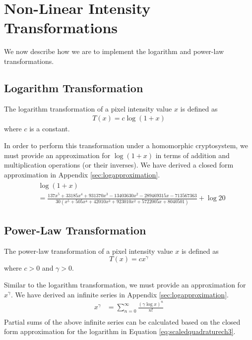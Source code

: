 \section{Non-Linear Intensity Transformations}
We now describe how we are to implement the logarithm and power-law transformations.
\subsection{Logarithm Transformation}
The logarithm transformation of a pixel intensity value $x$ is defined as
\begin{align}
	T\left(x\right) = c \log\left(1 + x\right)
\end{align}
where $c$ is a constant.

In order to perform this transformation under a homomorphic cryptosystem, we must provide an approximation for $\log\left(1 + x\right)$ in terms of addition and multiplication operations (or their inverses). We have derived a closed form approximation in Appendix \ref{sec:logapproximation}.
\begin{align}
	\label{eq:scaledquadraturech3}
  \begin{split}
    &\log(1+x) \\
    &=\frac{137x^5 + 33185x^4 + 931370x^3 - 13403630x^2 - 289469315x - 713567363}
    {30(x^5 + 505x^4 + 42010x^3 + 923010x^2 + 5722005x + 8040501)} + \log{20}
  \end{split}
\end{align}

\subsection{Power-Law Transformation}
The power-law transformation of a pixel intensity value $x$ is defined as
\begin{equation}
    T\left(x\right) = cx^{\gamma}
\end{equation}
where $c>0$ and $\gamma > 0$.

Similar to the logarithm transformation, we must provide an approximation for $x^\gamma$.
We have derived an infinite series in Appendix \ref{sec:logapproximation}.
\begin{align*}
	x^\gamma &= \sum_{n=0}^{\infty}{\frac{(\gamma\log{x})^n}{n!}}\\
\end{align*}
Partial sums of the above infinite series can be calculated based on the closed form approximation for the logarithm in Equation \ref{eq:scaledquadraturech3}. 
